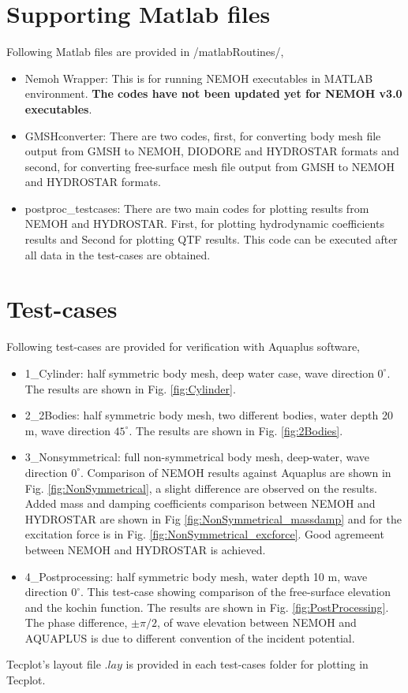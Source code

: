 \documentclass[12pt,a4paper,titlepage]{article}
\begin{document}
\section{Supporting Matlab files}\label{Sec:MatlabFiles}
Following Matlab files are provided in /matlabRoutines/,
\begin{itemize}
    \item Nemoh Wrapper: This is for running NEMOH executables in MATLAB environment. \textbf{\color{red}The codes have not been updated yet for NEMOH v3.0 executables}.
    \item GMSHconverter: There are two codes, first, for converting body mesh file output from GMSH to NEMOH, DIODORE and HYDROSTAR formats and second, for converting free-surface mesh file output from GMSH to NEMOH and HYDROSTAR formats.
    \item postproc\_testcases: There are two main codes for plotting results from NEMOH and HYDROSTAR. First, for plotting hydrodynamic coefficients results and Second for plotting QTF results. This code can be executed after all data in the test-cases are obtained.
\end{itemize}


\section{Test-cases}\label{Sec:Testcase}
Following test-cases are provided for verification with Aquaplus software,
\begin{itemize}
\item 1\_Cylinder: half symmetric body mesh, deep water case, wave direction $0^{\circ}$. The results are shown in Fig. \ref{fig:Cylinder}.
\item 2\_2Bodies: half symmetric body mesh, two different bodies, water depth 20 m, wave direction $45^{\circ}$. The results are shown in Fig. \ref{fig:2Bodies}.
\item 3\_Nonsymmetrical: full non-symmetrical body mesh, deep-water, wave direction $0^{\circ}$. Comparison of NEMOH results against Aquaplus are shown in Fig. \ref{fig:NonSymmetrical}, a slight difference are observed on the results.  Added mass and damping coefficients comparison between NEMOH and HYDROSTAR are shown in Fig \ref{fig:NonSymmetrical_massdamp} and for the excitation force is in Fig. \ref{fig:NonSymmetrical_excforce}. Good agremeent between NEMOH and HYDROSTAR is achieved.
\item 4\_Postprocessing: half symmetric body mesh, water depth 10 m, wave direction $0^{\circ}$. This test-case showing comparison of the free-surface elevation and the kochin function. The results are shown in Fig. \ref{fig:PostProcessing}. The phase difference, $\pm \pi/2$, of wave elevation between NEMOH and AQUAPLUS is due to different convention of the incident potential.
\end{itemize}
Tecplot's layout file $.lay$ is provided in each test-cases folder for plotting in Tecplot.
\end{document}

